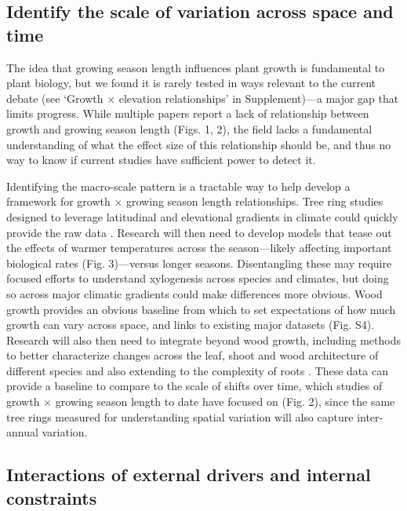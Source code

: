 \documentclass[11pt]{article}
\begin{document}
\subsection*{Identify the scale of variation across space and time} %

The idea that growing season length influences plant growth is fundamental to plant biology, but we found it is rarely tested in ways relevant to the current debate (see `Growth $\times$ elevation relationships' in Supplement)---a major gap that limits progress. While multiple papers report a lack of relationship between growth and growing season length (Figs. 1, 2), the field lacks a fundamental understanding of what the effect size of this relationship should be, and thus no way to know if current studies have sufficient power to detect it. 

Identifying the macro-scale pattern is a tractable way to help develop a framework for growth $\times$ growing season length relationships. Tree ring studies designed to leverage latitudinal and elevational gradients in climate could quickly provide the raw data \citep{manzanedo2024moving}. Research will then need to develop models that tease out the effects of warmer temperatures across the season---likely affecting important biological rates  (Fig. 3)---versus longer seasons. Disentangling these may require focused efforts to understand xylogenesis across species and climates, but doing so across major climatic gradients could make differences more obvious. Wood growth provides an obvious baseline from which to set expectations of how much growth can vary across space, and links to existing major datasets (Fig. S4).  Research will also then need to integrate beyond wood growth, including methods to better characterize changes across the leaf, shoot and wood architecture of different species \citep[e.g.][]{puletti2020lidar,sillett2024ground} and also extending to the complexity of roots \citep{mckown2016impacts,radville2016}. These data can provide a baseline to compare to the scale of shifts over time, which studies of growth $\times$ growing season length to date have focused on (Fig. 2), since the same tree rings measured for understanding spatial variation will also capture inter-annual variation. 

\subsection*{Interactions of external drivers and internal constraints} %
\end{document}
